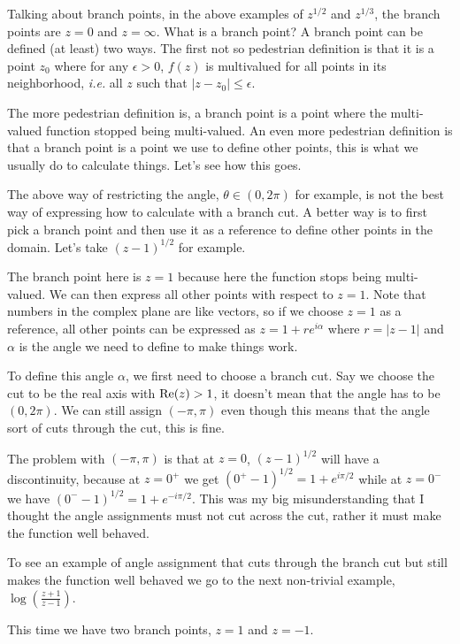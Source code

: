 \documentclass[aps,preprint,preprintnumbers,nofootinbib,showpacs,prd]{revtex4-1}
\newcommand{\ie}{{\it i.e.} }
\newcommand{\re}{{\rm Re}}
\begin{document}
Talking about branch points, in the above examples of $z^{1/2}$ and $z^{1/3}$, the branch points are $z = 0$ and $z = \infty$. What is a branch point? A branch point can be defined (at least) two ways. The first not so pedestrian definition is that it is a point $z_0$ where for any $\epsilon > 0$, $f(z)$ is multivalued for all points in its neighborhood, \ie all $z$ such that $|z - z_0| \le \epsilon$.

The more pedestrian definition is, a branch point is a point where the multi-valued function stopped being multi-valued. An even more pedestrian definition is that a branch point is a point we use to define other points, this is what we usually do to calculate things. Let's see how this goes.

The above way of restricting the angle, $\theta \in (0,2\pi)$ for example, is not the best way of expressing how to calculate with a branch cut. A better way is to first pick a branch point and then use it as a reference to define other points in the domain. Let's take $(z-1)^{1/2}$ for example.

The branch point here is $z=1$ because here the function stops being multi-valued. We can then express all other points with respect to $z = 1$. Note that numbers in the complex plane are like vectors, so if we choose $z=1$ as a reference, all other points can be expressed as $z = 1 + r e^{i\alpha}$ where $r = |z - 1|$ and $\alpha$ is the angle we need to define to make things work.

To define this angle $\alpha$, we first need to choose a branch cut. Say we choose the cut to be the real axis with $\re(z) > 1$, it doesn't mean that the angle has to be $(0,2\pi)$. We can still assign $(-\pi,\pi)$ even though this means that the angle sort of cuts through the cut, this is fine.

The problem with $(-\pi, \pi)$ is that at $z = 0$, $(z-1)^{1/2}$ will have a discontinuity, because at $z = 0^+$ we get $(0^+-1)^{1/2} = 1 + e^{i\pi/2}$ while at $z = 0^-$ we have $(0^--1)^{1/2} = 1 + e^{-i\pi/2}$. This was my big misunderstanding that I thought the angle assignments must not cut across the cut, rather it must make the function well behaved.

To see an example of angle assignment that cuts through the branch cut but still makes the function well behaved we go to the next non-trivial example, $\log \left ( \frac{z+1}{z-1}\right )$.

This time we have two branch points, $z = 1$ and $z = -1$. 
\end{document}
